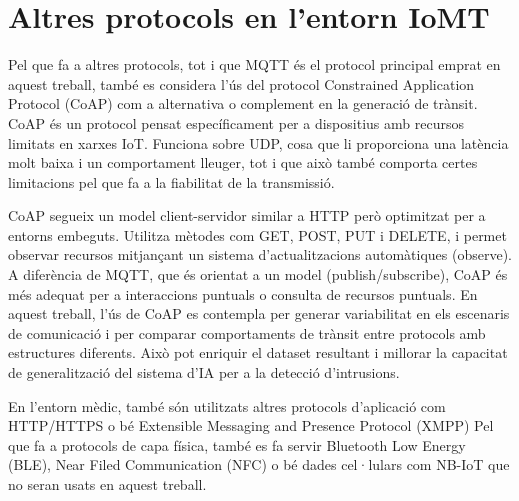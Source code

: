   \section{Altres protocols en l'entorn IoMT}
  Pel que fa a altres protocols, tot i que MQTT és el protocol principal emprat en aquest treball, també es considera l’ús del protocol Constrained Application Protocol (CoAP) com a alternativa o complement en la generació de trànsit. CoAP és un protocol pensat específicament per a dispositius amb recursos limitats en xarxes IoT. Funciona sobre UDP, cosa que li proporciona una latència molt baixa i un comportament lleuger, tot i que això també comporta certes limitacions pel que fa a la fiabilitat de la transmissió. 

  CoAP segueix un model client-servidor similar a HTTP però optimitzat per a entorns embeguts. Utilitza mètodes com GET, POST, PUT i DELETE, i permet observar recursos mitjançant un sistema d’actualitzacions automàtiques (observe). A diferència de MQTT, que és orientat a un model (publish/subscribe), CoAP és més adequat per a interaccions puntuals o consulta de recursos puntuals. En aquest treball, l’ús de CoAP es contempla per generar variabilitat en els escenaris de comunicació i per comparar comportaments de trànsit entre protocols amb estructures diferents. Això pot enriquir el dataset resultant i millorar la capacitat de generalització del sistema d’IA per a la detecció d’intrusions. 

  En l’entorn mèdic, també són utilitzats altres protocols d’aplicació com HTTP/HTTPS o bé Extensible Messaging and Presence Protocol (XMPP) Pel que fa a protocols de capa física, també es fa servir Bluetooth Low Energy (BLE), Near Filed Communication (NFC) o bé dades cel·lulars com NB-IoT que no seran usats en aquest treball.